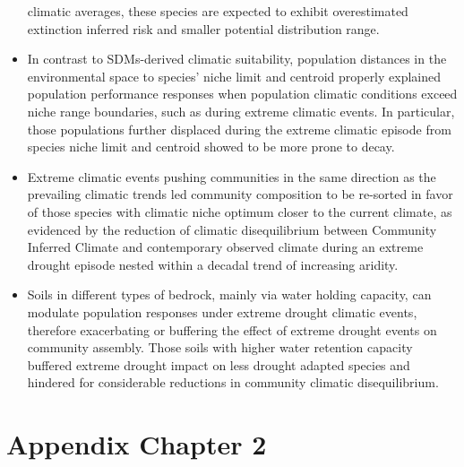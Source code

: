 \documentclass[11pt,twoside]{reedthesis}
\begin{document}
\begin{itemize}
  climatic averages, these species are expected to exhibit overestimated
  extinction inferred risk and smaller potential distribution range.\par
\item
  In contrast to SDMs-derived climatic suitability, population distances
  in the environmental space to species' niche limit and centroid
  properly explained population performance responses when population
  climatic conditions exceed niche range boundaries, such as during
  extreme climatic events. In particular, those populations further
  displaced during the extreme climatic episode from species niche limit
  and centroid showed to be more prone to decay.\par
\item
  Extreme climatic events pushing communities in the same direction as
  the prevailing climatic trends led community composition to be
  re-sorted in favor of those species with climatic niche optimum closer
  to the current climate, as evidenced by the reduction of climatic
  disequilibrium between Community Inferred Climate and contemporary
  observed climate during an extreme drought episode nested within a
  decadal trend of increasing aridity.\par
\item
  Soils in different types of bedrock, mainly via water holding
  capacity, can modulate population responses under extreme drought
  climatic events, therefore exacerbating or buffering the effect of
  extreme drought events on community assembly. Those soils with higher
  water retention capacity buffered extreme drought impact on less
  drought adapted species and hindered for considerable reductions in
  community climatic disequilibrium.\par
\end{itemize}
\appendix

\chapter{Appendix Chapter 2}\label{appendix-chapter-2}

\newpage

\setlength{\abovecaptionskip}{0pt}
\end{document}
